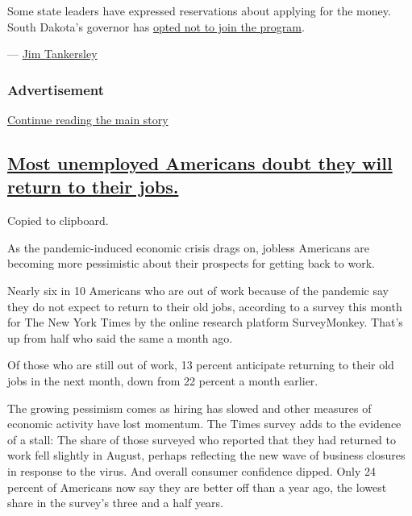 Some state leaders have expressed reservations about applying for the
money. South Dakota's governor has
\href{https://www.cnn.com/2020/08/16/politics/south-dakota-trump-unemployment-benefits/index.html}{opted
not to join the program}.

--- \href{https://www.nytimes3xbfgragh.onion/by/jim-tankersley}{Jim
Tankersley}

\hypertarget{advertisement}{%
\subsubsection{Advertisement}\label{advertisement}}

\protect\hyperlink{after-dfp-ad-mid1}{Continue reading the main story}

\hypertarget{most-unemployed-americans-doubt-they-will-return-to-their-jobs}{%
\subsection{\texorpdfstring{\protect\hyperlink{most-unemployed-americans-doubt-they-will-return-to-their-jobs}{Most
unemployed Americans doubt they will return to their
jobs.}}{Most unemployed Americans doubt they will return to their jobs.}}\label{most-unemployed-americans-doubt-they-will-return-to-their-jobs}}

Copied to clipboard.

As the pandemic-induced economic crisis drags on, jobless Americans are
becoming more pessimistic about their prospects for getting back to
work.

Nearly six in 10 Americans who are out of work because of the pandemic
say they do not expect to return to their old jobs, according to a
survey this month for The New York Times by the online research platform
SurveyMonkey. That's up from half who said the same a month ago.

Of those who are still out of work, 13 percent anticipate returning to
their old jobs in the next month, down from 22 percent a month earlier.

The growing pessimism comes as hiring has slowed and other measures of
economic activity have lost momentum. The Times survey adds to the
evidence of a stall: The share of those surveyed who reported that they
had returned to work fell slightly in August, perhaps reflecting the new
wave of business closures in response to the virus. And overall consumer
confidence dipped. Only 24 percent of Americans now say they are better
off than a year ago, the lowest share in the survey's three and a half
years.


